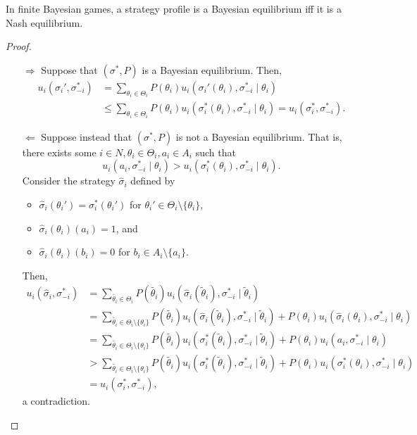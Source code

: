 	\begin{ftheo}
		In finite Bayesian games, a strategy profile is a Bayesian equilibrium iff it is a Nash equilibrium.
	\end{ftheo}
	\begin{proof}
		\phantom{pain}
		\begin{itemize}
			\item[$\Rightarrow$] Suppose that $(\sigma^*,P)$ is a Bayesian equilibrium. Then,
			\begin{align*}
				u_i(\sigma_i',\sigma_{-i}^*) &= \sum_{\theta_i \in \Theta_i} P(\theta_i) u_i(\sigma_i'(\theta_i),\sigma_{-i}^* \mid \theta_i) \\
					&\le \sum_{\theta_i \in \Theta_i} P(\theta_i) u_i(\sigma_i^*(\theta_i),\sigma_{-i}^* \mid \theta_i) = u_i(\sigma_i^*,\sigma_{-i}^*).
			\end{align*}
			\item[$\Leftarrow$] Suppose instead that $(\sigma^*,P)$ is not a Bayesian equilibrium. That is, there exists some $i\in N,\theta_i \in \Theta_i,a_i \in A_i$ such that
			\[ u_i(a_i,\sigma_{-i}^* \mid \theta_i) > u_i(\sigma_i^*(\theta_i),\sigma_{-i}^* \mid \theta_i). \]
			Consider the strategy $\widehat{\sigma}_i$ defined by
			\begin{itemize}
				\item $\widehat{\sigma}_i(\theta_i') = \sigma_i^*(\theta_i')$ for $\theta_i' \in \Theta_i \setminus \{\theta_i\}$,
				\item $\widehat{\sigma}_i(\theta_i)(a_i) = 1$, and
				\item $\widehat{\sigma}_i(\theta_i)(b_i) = 0$ for $b_i \in A_i \setminus \{a_i\}$.
			\end{itemize}
			Then,
			\begin{align*}
				u_i(\widehat{\sigma}_i,\sigma_{-i}^*) &= \sum_{\tilde{\theta_i} \in \Theta_i} P(\tilde{\theta_i}) u_i(\widehat{\sigma}_i(\tilde{\theta}_i),\sigma_{-i}^* \mid \tilde{\theta}_i) \\
					&= \sum_{\tilde{\theta_i} \in \Theta_i \setminus \{\theta_i\}} P(\tilde{\theta_i}) u_i(\widehat{\sigma}_i(\tilde{\theta}_i),\sigma_{-i}^* \mid \tilde{\theta}_i) + P(\theta_i) u_i(\widehat{\sigma}_i(\theta_i),\sigma_{-i}^* \mid \theta_i) \\
					&= \sum_{\tilde{\theta_i} \in \Theta_i \setminus \{\theta_i\}} P(\tilde{\theta_i}) u_i(\sigma^*_i(\tilde{\theta}_i),\sigma_{-i}^* \mid \tilde{\theta}_i) + P(\theta_i) u_i(a_i,\sigma_{-i}^* \mid \theta_i) \\
					&> \sum_{\tilde{\theta_i} \in \Theta_i \setminus \{\theta_i\}} P(\tilde{\theta_i}) u_i(\sigma^*_i(\tilde{\theta}_i),\sigma_{-i}^* \mid \tilde{\theta}_i) + P(\theta_i) u_i(\sigma_i^*(\theta_i),\sigma_{-i}^* \mid \theta_i) \\
					&= u_i(\sigma_i^*,\sigma_{-i}^*),
			\end{align*}
			a contradiction. \qedhere
		\end{itemize}
	\end{proof}

